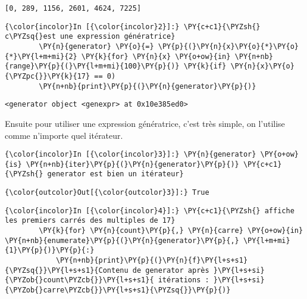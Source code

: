     \begin{Verbatim}[commandchars=\\\{\},frame=single,framerule=0.3mm,rulecolor=\color{cellframecolor}]
[0, 289, 1156, 2601, 4624, 7225]
\end{Verbatim}

    \begin{Verbatim}[commandchars=\\\{\},frame=single,framerule=0.3mm,rulecolor=\color{cellframecolor}]
{\color{incolor}In [{\color{incolor}2}]:} \PY{c+c1}{\PYZsh{} c\PYZsq{}est une expression génératrice}
        \PY{n}{generator} \PY{o}{=} \PY{p}{(}\PY{n}{x}\PY{o}{*}\PY{o}{*}\PY{l+m+mi}{2} \PY{k}{for} \PY{n}{x} \PY{o+ow}{in} \PY{n+nb}{range}\PY{p}{(}\PY{l+m+mi}{100}\PY{p}{)} \PY{k}{if} \PY{n}{x}\PY{o}{\PYZpc{}}\PY{k}{17} == 0) 
        \PY{n+nb}{print}\PY{p}{(}\PY{n}{generator}\PY{p}{)}
\end{Verbatim}


    \begin{Verbatim}[commandchars=\\\{\},frame=single,framerule=0.3mm,rulecolor=\color{cellframecolor}]
<generator object <genexpr> at 0x10e385ed0>
\end{Verbatim}

    Ensuite pour utiliser une expression génératrice, c'est très simple, on
l'utilise comme n'importe quel itérateur.

    \begin{Verbatim}[commandchars=\\\{\},frame=single,framerule=0.3mm,rulecolor=\color{cellframecolor}]
{\color{incolor}In [{\color{incolor}3}]:} \PY{n}{generator} \PY{o+ow}{is} \PY{n+nb}{iter}\PY{p}{(}\PY{n}{generator}\PY{p}{)} \PY{c+c1}{\PYZsh{} generator est bien un itérateur}
\end{Verbatim}


\begin{Verbatim}[commandchars=\\\{\},frame=single,framerule=0.3mm,rulecolor=\color{cellframecolor}]
{\color{outcolor}Out[{\color{outcolor}3}]:} True
\end{Verbatim}
            
    \begin{Verbatim}[commandchars=\\\{\},frame=single,framerule=0.3mm,rulecolor=\color{cellframecolor}]
{\color{incolor}In [{\color{incolor}4}]:} \PY{c+c1}{\PYZsh{} affiche les premiers carrés des multiples de 17}
        \PY{k}{for} \PY{n}{count}\PY{p}{,} \PY{n}{carre} \PY{o+ow}{in} \PY{n+nb}{enumerate}\PY{p}{(}\PY{n}{generator}\PY{p}{,} \PY{l+m+mi}{1}\PY{p}{)}\PY{p}{:}
            \PY{n+nb}{print}\PY{p}{(}\PY{n}{f}\PY{l+s+s1}{\PYZsq{}}\PY{l+s+s1}{Contenu de generator après }\PY{l+s+si}{\PYZob{}count\PYZcb{}}\PY{l+s+s1}{ itérations : }\PY{l+s+si}{\PYZob{}carre\PYZcb{}}\PY{l+s+s1}{\PYZsq{}}\PY{p}{)}
\end{Verbatim}


